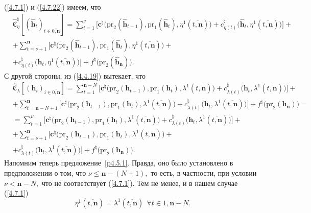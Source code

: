 \documentclass[11pt,twoside,openany]{report}
\newcommand{\bfn}{\begin{equation}}
\newcommand{\efn}{\end{equation}}
\newcommand{\ov}{\overline}
\newcommand{\la}{\lambda}
\newcommand{\fa}{\forall}
\newcommand{\zc}{{\mathbf c}}
\newcommand{\nn}{{\mathbf n}}
\begin{document}
{{(\ref{4.7.1}) и (\ref{4.7.22}) имеем, что
\begin{eqnarray}
&\widehat{\mathfrak{C}}_\eta^\natural[(\hat{\mathbf{h}}_t)_{t\in\ov{0,\nn}}] = \sum\limits_{t=1}^\nu\bigl[
\zc^\natural\bigl(\mathrm{pr}_2(\hat{\mathbf{h}}_{t-1}),\mathrm{pr}_1(\hat{\mathbf{h}}_t),
\eta^1(\ov{t,\nn})\bigl)+ c_{\eta(t)}^\natural\bigl(\hat{\mathbf{h}}_t,\eta^1(\ov{t,\nn})\bigl)\bigl] +
&\nonumber\\
&+\sum\limits_{t=\nu+1}^\nn\bigl[
\zc^\natural\bigl(\mathrm{pr}_2(\hat{\mathbf{h}}_{t-1}),\mathrm{pr}_1(\hat{\mathbf{h}}_t),
\eta^1(\ov{t,\nn})\bigl)+
&\nonumber\\
&+c_{\eta(t)}^\natural\bigl(\hat{\mathbf{h}}_t,\eta^1(\ov{t,\nn})\bigl)\bigl] +
f^\natural\bigl(\mathrm{pr}_2(\hat{\mathbf{h}}_\nn)\bigl).
&\label{4.7.23}
\end{eqnarray}
С другой стороны, из (\ref{4.4.19}) вытекает, что
\begin{eqnarray}
&\widehat{\mathfrak{C}}_\la[(\mathbf{h}_i)_{i\in\ov{0,\nn}}] = \sum\limits_{t=1}^{\nn-N}\bigl[
\zc^\natural\bigl(\mathrm{pr}_2(\mathbf{h}_{t-1}),\mathrm{pr}_1(\mathbf{h}_t),
\la^1(\ov{t,\nn})\bigl)+ c_{\la(t)}^\natural\bigl(\mathbf{h}_t,\la^1(\ov{t,\nn})\bigl)\bigl] +
&\nonumber\\
&+\sum\limits_{t=\nn-N+1}^\nn\bigl[
\zc^\natural\bigl(\mathrm{pr}_2(\mathbf{h}_{t-1}),\mathrm{pr}_1(\mathbf{h}_t),
\la^1(\ov{t,\nn})\bigl)+ c_{\la(t)}^\natural\bigl(\mathbf{h}_t,\la^1(\ov{t,\nn})\bigl)\bigl] +
f^\natural\bigl(\mathrm{pr}_2(\mathbf{h}_\nn)\bigl)=
&\nonumber\\
&=\sum\limits_{t=1}^\nu\bigl[
\zc^\natural\bigl(\mathrm{pr}_2(\mathbf{h}_{t-1}),\mathrm{pr}_1(\mathbf{h}_t),
\la^1(\ov{t,\nn})\bigl)+ c_{\la(t)}^\natural\bigl(\mathbf{h}_t,\la^1(\ov{t,\nn})\bigl)\bigl] +
&\nonumber\\
&+\sum\limits_{t=\nu+1}^\nn\bigl[
\zc^\natural\bigl(\mathrm{pr}_2(\mathbf{h}_{t-1}),\mathrm{pr}_1(\mathbf{h}_t),
\la^1(\ov{t,\nn})\bigl)+
&\nonumber\\
&+c_{\la(t)}^\natural\bigl(\mathbf{h}_t,\la^1(\ov{t,\nn})\bigl)\bigl] +
f^\natural\bigl(\mathrm{pr}_2(\mathbf{h}_\nn)\bigl).
&\label{4.7.24}
\end{eqnarray}
Напомним теперь предложение~\ref{p4.5.1}. Правда, оно было установлено в предположении о том, что
$\nu \leqslant \nn-(N+1),$ то есть, в частности, при условии $\nu <\nn - N,$ что не соответствует
(\ref{4.7.1}). Тем не менее, и в нашем случае (\ref{4.7.1})
\bfn\label{4.7.25}\eta^1(\ov{t,\nn}) = \la^1(\ov{t,\nn})\ \ \fa t\in \ov{1,\nn-N}.
\efn

}}
\end{document}
